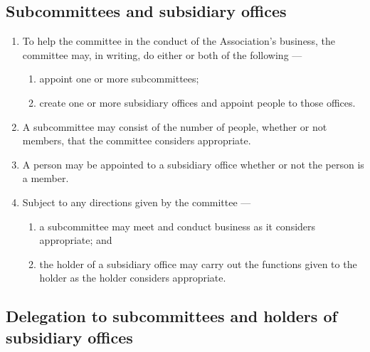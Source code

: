 \documentclass[../constitution.tex]{subfiles}
\begin{document}
\hypertarget{subcommittees-and-subsidiary-offices}{%
\subsection{Subcommittees and subsidiary offices}\label{subcommittees-and-subsidiary-offices}}

\begin{enumerate}

\item To help the committee in the conduct of the Association's business, the committee may, in writing, do either or both of the following ---

  \begin{enumerate}
  
  \item appoint one or more subcommittees; \label{appoint-subcommittees}
  \item create one or more subsidiary offices and appoint people to those offices.
  \end{enumerate}
\item A subcommittee may consist of the number of people, whether or not members, that the committee considers appropriate.
\item A person may be appointed to a subsidiary office whether or not the person is a member.
\item Subject to any directions given by the committee ---

  \begin{enumerate}
  
  \item a subcommittee may meet and conduct business as it considers appropriate; and
  \item the holder of a subsidiary office may carry out the functions given to the holder as the holder considers appropriate.
  \end{enumerate}
\end{enumerate}

\hypertarget{delegation-to-subcommittees-and-holders-of-subsidiary-offices}{%
\subsection{Delegation to subcommittees and holders of subsidiary offices}\label{delegation-to-subcommittees-and-holders-of-subsidiary-offices}}
\end{document}
